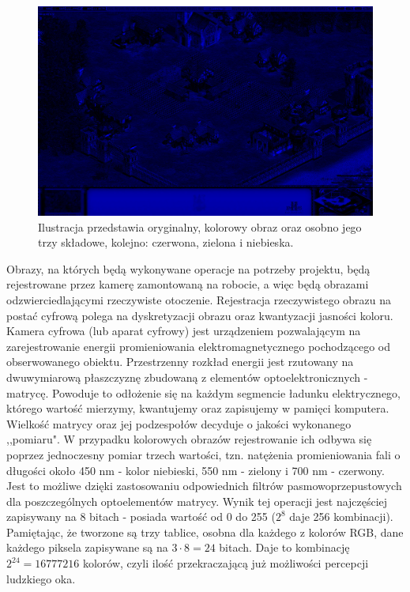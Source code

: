 \begin{figure}[H]
\begin{center}
\includegraphics[scale=0.2]{imgs/blue.jpg}
\caption[Rozbicie obrazu kolorowego na RGB.]{\small{Ilustracja przedstawia oryginalny, kolorowy obraz oraz osobno jego trzy składowe, kolejno: czerwona, zielona i niebieska.}\footnotemark}
\label{rgb}
\end{center}
\end{figure}

Obrazy, na których będą wykonywane operacje na potrzeby projektu, będą rejestrowane przez kamerę zamontowaną na robocie, a więc będą obrazami odzwierciedlającymi rzeczywiste otoczenie. Rejestracja rzeczywistego obrazu na postać cyfrową polega na dyskretyzacji obrazu oraz kwantyzacji jasności koloru\cite{Malina}. Kamera cyfrowa (lub aparat cyfrowy) jest urządzeniem pozwalającym na zarejestrowanie energii promieniowania elektromagnetycznego pochodzącego od obserwowanego obiektu. Przestrzenny rozkład energii jest rzutowany na dwuwymiarową płaszczyznę zbudowaną z elementów optoelektronicznych - matrycę. Powoduje to odłożenie się na każdym segmencie ładunku elektrycznego, którego wartość mierzymy, kwantujemy oraz zapisujemy w pamięci komputera. Wielkość matrycy oraz jej podzespołów decyduje o jakości wykonanego ,,pomiaru". W przypadku kolorowych obrazów rejestrowanie ich odbywa się poprzez jednoczesny pomiar trzech wartości, tzn. natężenia promieniowania fali o długości około 450 nm - kolor niebieski, 550 nm - zielony i 700 nm - czerwony. Jest to możliwe dzięki zastosowaniu odpowiednich filtrów pasmowoprzepustowych dla poszczególnych optoelementów matrycy.
Wynik tej operacji jest najczęściej zapisywany na 8 bitach - posiada wartość od 0 do 255 ($2^8$ daje 256 kombinacji). Pamiętając, że tworzone są trzy tablice, osobna dla każdego z kolorów RGB, dane każdego piksela zapisywane są na $3 \cdot 8 = 24$ bitach. Daje to kombinację $2^{24} = 16777216$ kolorów, czyli ilość przekraczającą już możliwości percepcji ludzkiego oka.

